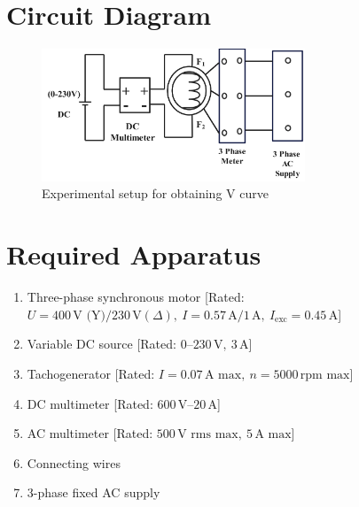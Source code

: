 \documentclass[a4paper,12pt]{article}
\begin{document}
	


	\section{Circuit Diagram}
	\begin{figure}[H]
		\centering
		\includegraphics[width=0.7\textwidth]{Images/3}
		\caption{Experimental setup for obtaining V curve}
		
	\end{figure}
	
	
	
	\section{Required Apparatus}
	
	\begin{enumerate}
		\item Three-phase synchronous motor [Rated: \(U = 400\,\text{V (Y)} / 230\,\text{V}(\Delta),\ I = 0.57\,\text{A}/1\,\text{A},\ I_\text{exc} = 0.45\,\text{A}\)]
		\item Variable DC source [Rated: \(0\text{–}230\,\text{V},\ 3\,\text{A}\)]
		\item Tachogenerator [Rated: \(I = 0.07\,\text{A max},\ n = 5000\,\text{rpm max}\)]
		\item DC multimeter [Rated: \(600\,\text{V} – 20\,\text{A}\)]
		\item AC multimeter [Rated: \(500\,\text{V rms max},\ 5\,\text{A max}\)]
		\item Connecting wires
		\item 3-phase fixed AC supply
	\end{enumerate}
	

	
\end{document}
